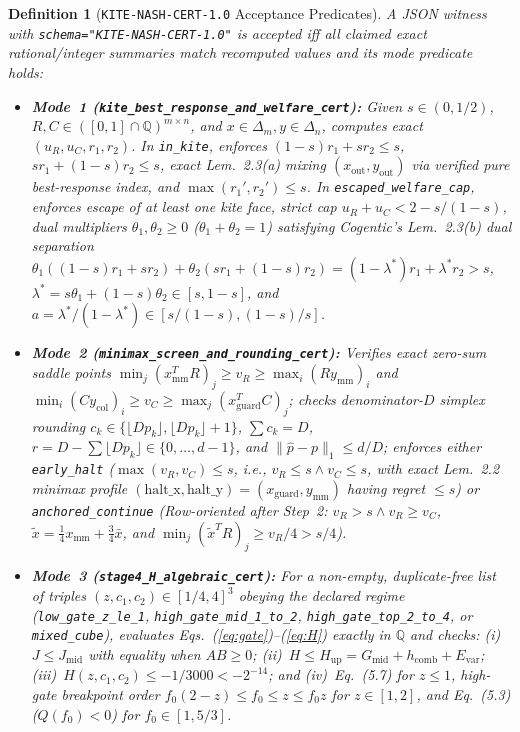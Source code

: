 \documentclass[10pt,twocolumn]{article}
\newtheorem{definition}{Definition}
\newcommand{\QQ}{\mathbb{Q}}
\begin{document}
\begin{definition}[\texttt{KITE-NASH-CERT-1.0} Acceptance Predicates]\label{def:cert}
\normalfont A JSON witness with \texttt{schema="KITE-NASH-CERT-1.0"} is accepted iff all claimed exact rational/integer summaries match recomputed values and its mode predicate holds:
\begin{itemize}[leftmargin=1.2em,itemsep=1pt,topsep=2pt]
  \item \textbf{Mode~1 (\texttt{kite\_best\_response\_and\_welfare\_cert}):} Given $s\in(0,1/2)$, $R,C\in([0,1]\cap\QQ)^{m\times n}$, and $x\in\Delta_m, y\in\Delta_n$, computes exact $(u_R,u_C,r_1,r_2)$. In \texttt{in\_kite}, enforces $(1{-}s)r_1+sr_2\le s$, $sr_1+(1{-}s)r_2\le s$, exact Lem.~2.3(a) mixing $(x_{\mathrm{out}},y_{\mathrm{out}})$ via verified pure best-response index, and $\max(r_1',r_2')\le s$. In \texttt{escaped\_welfare\_cap}, enforces escape of at least one kite face, strict cap $u_R+u_C < 2 - s/(1-s)$, dual multipliers $\theta_1,\theta_2\ge 0$ ($\theta_1+\theta_2=1$) satisfying Cogentic's Lem.~2.3(b) dual separation $\theta_1((1{-}s)r_1+sr_2) + \theta_2(sr_1+(1{-}s)r_2) = (1{-}\lambda^*)r_1+\lambda^* r_2 > s$, $\lambda^*=s\theta_1+(1{-}s)\theta_2\in[s,1{-}s]$, and $a=\lambda^*/(1{-}\lambda^*)\in[s/(1{-}s),(1{-}s)/s]$.
  \item \textbf{Mode~2 (\texttt{minimax\_screen\_and\_rounding\_cert}):} Verifies exact zero-sum saddle points $\min_j(x_{\mathrm{mm}}^T R)_j \ge v_R \ge \max_i(R y_{\mathrm{mm}})_i$ and $\min_i(C y_{\mathrm{col}})_i \ge v_C \ge \max_j(x_{\mathrm{guard}}^T C)_j$; checks denominator-$D$ simplex rounding $c_k\in\{\lfloor D p_k\rfloor,\lfloor D p_k\rfloor+1\}$, $\sum c_k=D$, $r=D-\sum\lfloor D p_k\rfloor\in\{0,\dots,d-1\}$, and $\|\hat{p}-p\|_1\le d/D$; enforces either \texttt{early\_halt} ($\max(v_R,v_C)\le s$, i.e., $v_R\le s \wedge v_C\le s$, with exact Lem.~2.2 minimax profile $(\text{halt\_x},\text{halt\_y})=(x_{\mathrm{guard}},y_{\mathrm{mm}})$ having regret $\le s$) or \texttt{anchored\_continue} (Row-oriented after Step~2: $v_R>s \wedge v_R\ge v_C$, $\tilde{x}=\frac14 x_{\mathrm{mm}}+\frac34\bar{x}$, and $\min_j(\tilde{x}^T R)_j \ge v_R/4 > s/4$).
  \item \textbf{Mode~3 (\texttt{stage4\_H\_algebraic\_cert}):} For a non-empty, duplicate-free list of triples $(z,c_1,c_2)\in[1/4,4]^3$ obeying the declared regime (\texttt{low\_gate\_z\_le\_1}, \texttt{high\_gate\_mid\_1\_to\_2}, \texttt{high\_gate\_top\_2\_to\_4}, or \texttt{mixed\_cube}), evaluates Eqs.~(\ref{eq:gate})--(\ref{eq:H}) exactly in $\QQ$ and checks: (i)~$J\le J_{\mathrm{mid}}$ with equality when $AB\ge 0$; (ii)~$H \le H_{\mathrm{up}} = G_{\mathrm{mid}}+h_{\mathrm{comb}}+E_{\mathrm{var}}$; (iii)~$H(z,c_1,c_2)\le -1/3000 < -2^{-14}$; and (iv)~Eq.~(5.7) for $z\le 1$, high-gate breakpoint order $f_0(2{-}z)\le f_0\le z\le f_0 z$ for $z\in[1,2]$, and Eq.~(5.3) ($Q(f_0)<0$) for $f_0\in[1,5/3]$.

\end{itemize}
\end{definition}
\end{document}
